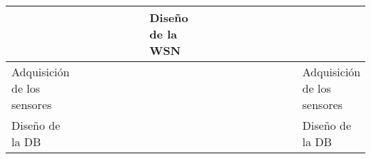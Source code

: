 \begin{table}[H]
{\begin{tabular}{|l|llllllllllllllll|l|}
  \multicolumn{1}{l|}{} &
  \multicolumn{1}{l|}{\cellcolor[HTML]{FFFF00}} &
  \multicolumn{1}{l|}{\cellcolor[HTML]{FFFF00}} &
  \multicolumn{1}{l|}{\cellcolor[HTML]{FFFF00}} &
  \multicolumn{1}{l|}{\cellcolor[HTML]{FFFF00}} &
  \multicolumn{1}{l|}{\cellcolor[HTML]{FFFF00}} &
   &
  Diseño de la WSN \\ \hline
Adquisición de los sensores &
  \multicolumn{1}{l|}{} &
  \multicolumn{1}{l|}{} &
  \multicolumn{1}{l|}{} &
  \multicolumn{1}{l|}{} &
  \multicolumn{1}{l|}{} &
  \multicolumn{1}{l|}{} &
  \multicolumn{1}{l|}{} &
  \multicolumn{1}{l|}{} &
  \multicolumn{1}{l|}{} &
  \multicolumn{1}{l|}{} &
  \multicolumn{1}{l|}{} &
  \multicolumn{1}{l|}{} &
  \multicolumn{1}{l|}{\cellcolor[HTML]{FFFF00}} &
  \multicolumn{1}{l|}{\cellcolor[HTML]{FFFF00}} &
  \multicolumn{1}{l|}{} &
   &
  Adquisición de los sensores \\ \hline
Diseño de la DB &
  \multicolumn{1}{l|}{} &
  \multicolumn{1}{l|}{} &
  \multicolumn{1}{l|}{} &
  \multicolumn{1}{l|}{} &
  \multicolumn{1}{l|}{} &
  \multicolumn{1}{l|}{} &
  \multicolumn{1}{l|}{} &
  \multicolumn{1}{l|}{} &
  \multicolumn{1}{l|}{} &
  \multicolumn{1}{l|}{} &
  \multicolumn{1}{l|}{} &
  \multicolumn{1}{l|}{} &
  \multicolumn{1}{l|}{\cellcolor[HTML]{BDD7EE}} &
  \multicolumn{1}{l|}{\cellcolor[HTML]{BDD7EE}} &
  \multicolumn{1}{l|}{\cellcolor[HTML]{BDD7EE}} &
   &
  Diseño de la DB \\ \hline
\end{tabular}%
}
\end{table}

\endinput